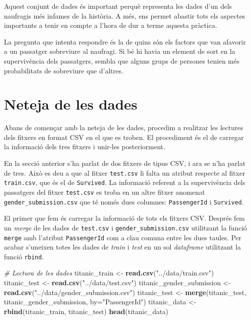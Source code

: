 \documentclass[]{article}
\newenvironment{Shaded}{\begin{snugshade}}{\end{snugshade}}
\newcommand{\CommentTok}[1]{\textcolor[rgb]{0.56,0.35,0.01}{\textit{#1}}}
\newcommand{\DataTypeTok}[1]{\textcolor[rgb]{0.13,0.29,0.53}{#1}}
\newcommand{\KeywordTok}[1]{\textcolor[rgb]{0.13,0.29,0.53}{\textbf{#1}}}
\newcommand{\NormalTok}[1]{#1}
\newcommand{\StringTok}[1]{\textcolor[rgb]{0.31,0.60,0.02}{#1}}
\begin{document}
Aquest conjunt de dades és important perquè representa les dades d'un
dels naufragis més infames de la història. A més, ens permet abastir
tots els aspectes importants a tenir en compte a l'hora de dur a terme
aquesta pràctica.

La pregunta que intenta respondre és la de quins són els factors que van
afavorir a un passatger sobreviure al naufragi. Si bé hi havia un
element de sort en la supervivència dels passatgers, sembla que alguns
grups de persones tenien més probabilitats de sobreviure que d'altres.

\hypertarget{neteja-de-les-dades}{%
\section{Neteja de les dades}\label{neteja-de-les-dades}}

Abans de començar amb la neteja de les dades, procedim a realitzar les
lectures dels fitxers en format CSV en el que es troben. El procediment
és el de carregar la informació dels tres fitxers i unir-les
posteriorment.

En la secció anterior s'ha parlat de dos fitxers de tipus CSV, i ara se
n'ha parlat de tres. Això es deu a que al fitxer \texttt{test.csv} li
falta un atribut respecte al fitxer \texttt{train.csv}, que és el de
\texttt{Survived}. La informació referent a la supervivència dels
passatgers del fitxer \texttt{test.csv} es troba en un altre fitxer
anomenat \texttt{gender\_submission.csv} que té només dues columnes:
\texttt{PassengerId} i \texttt{Survived}.

El primer que fem és carregar la informació de tots els fitxers CSV.
Després fem un \emph{merge} de les dades de \texttt{test.csv} i
\texttt{gender\_submission.csv} utilitzant la funció \texttt{merge} amb
l'atribut \texttt{PassengerId} com a clau comuna entre les dues taules.
Per acabar s'uneixen totes les dades de \emph{train} i \emph{test} en un
sol \emph{dataframe} utilitzant la funció \texttt{rbind}.

\begin{Shaded}
\begin{Highlighting}[]
\CommentTok{# Lectura de les dades}
\NormalTok{titanic_train <-}\StringTok{ }\KeywordTok{read.csv}\NormalTok{(}\StringTok{"../data/train.csv"}\NormalTok{)}
\NormalTok{titanic_test <-}\StringTok{ }\KeywordTok{read.csv}\NormalTok{(}\StringTok{"../data/test.csv"}\NormalTok{)}
\NormalTok{titanic_gender_submission <-}\StringTok{ }\KeywordTok{read.csv}\NormalTok{(}\StringTok{"../data/gender_submission.csv"}\NormalTok{)}
\NormalTok{titanic_test <-}\StringTok{ }\KeywordTok{merge}\NormalTok{(titanic_test, titanic_gender_submission, }\DataTypeTok{by=}\StringTok{"PassengerId"}\NormalTok{)}
\NormalTok{titanic_data <-}\StringTok{ }\KeywordTok{rbind}\NormalTok{(titanic_train, titanic_test)}
\KeywordTok{head}\NormalTok{(titanic_data)}
\end{Highlighting}
\end{Shaded}
\end{document}
